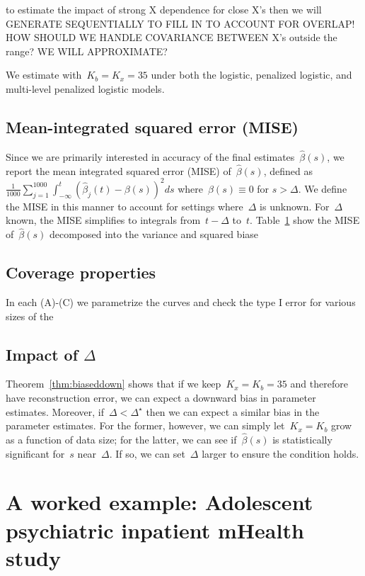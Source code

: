 \documentclass[12pt]{amsart}
\begin{document}
to estimate the impact of strong X dependence for close X's then we
will GENERATE SEQUENTIALLY TO FILL IN TO ACCOUNT FOR OVERLAP!
HOW SHOULD WE HANDLE COVARIANCE BETWEEN X's outside the range?
WE WILL APPROXIMATE?

We estimate with~$K_b = K_x = 35$ under both the logistic, penalized
logistic, and multi-level penalized logistic models.



\subsection{Mean-integrated squared error (MISE)}

Since we are primarily interested in accuracy of the final
estimates~$\hat \beta(s)$, we report the mean integrated  squared
error (MISE) of~$\hat \beta (s)$, defined as~$\frac{1}{1000}
\sum_{j=1}^{1000} \int_{-\infty}^t ( \hat \beta_j (t) - \beta(s))^2
ds$ where~$\beta(s) \equiv 0$ for $s > \Delta$.  We define the MISE in
this manner to account for settings where~$\Delta$ is unknown.
For~$\Delta$ known, the MISE simplifies to integrals from~$t-\Delta$
to~$t$.
Table~\ref{} show the MISE of~$\hat \beta (s)$ decomposed into the
variance and squared biase




\subsection{Coverage properties}

In each (A)-(C) we parametrize the curves and check the type I error
for various sizes of the 

\subsection{Impact of $\Delta$}

Theorem~\ref{thm:biaseddown} shows that if we keep~$K_x = K_b = 35$
and therefore have reconstruction error, we can expect a downward bias
in parameter estimates.
Moreover, if~$\Delta < \Delta^\star$ then we can expect a similar bias
in the parameter estimates.  For the former, however, we can simply
let~$K_x = K_b$ grow as a function of data size; for the latter, we
can see if~$\hat \beta(s)$ is statistically significant for~$s$
near~$\Delta$. If so, we can set~$\Delta$ larger to ensure the
condition holds.

\section{A worked example: Adolescent psychiatric inpatient mHealth study}
\end{document}
